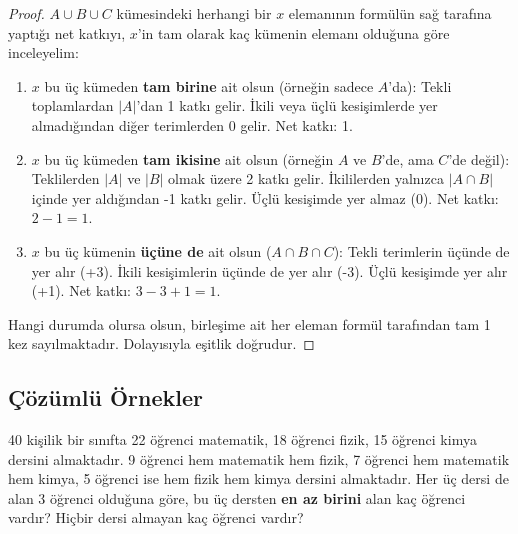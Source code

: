 \begin{proof} $A \cup B \cup C$ kümesindeki herhangi bir $x$ elemanının formülün sağ
tarafına yaptığı net katkıyı, $x$'in tam olarak kaç kümenin elemanı olduğuna göre
inceleyelim: \begin{enumerate} \item $x$ bu üç kümeden \textbf{tam birine} ait
olsun (örneğin sadece $A$'da): Tekli toplamlardan $|A|$'dan 1 katkı gelir. İkili
veya üçlü kesişimlerde yer almadığından diğer terimlerden 0 gelir. Net katkı: 1.
\item $x$ bu üç kümeden \textbf{tam ikisine} ait olsun (örneğin $A$ ve $B$'de, ama
$C$'de değil): Teklilerden $|A|$ ve $|B|$ olmak üzere 2 katkı gelir. İkililerden
yalnızca $|A \cap B|$ içinde yer aldığından -1 katkı gelir. Üçlü kesişimde yer
almaz (0). Net katkı: $2 - 1 = 1$. \item $x$ bu üç kümenin \textbf{üçüne de} ait
olsun ($A \cap B \cap C$): Tekli terimlerin üçünde de yer alır (+3). İkili
kesişimlerin üçünde de yer alır (-3). Üçlü kesişimde yer alır (+1). Net katkı:
$3 - 3 + 1 = 1$. \end{enumerate} Hangi durumda olursa olsun, birleşime ait her
eleman formül tarafından tam 1 kez sayılmaktadır. Dolayısıyla eşitlik
doğrudur. \end{proof}

\subsection{Çözümlü Örnekler}

\begin{example} 40 kişilik bir sınıfta 22 öğrenci matematik, 18 öğrenci fizik,
15 öğrenci kimya dersini almaktadır. 9 öğrenci hem matematik hem fizik, 7
öğrenci hem matematik hem kimya, 5 öğrenci ise hem fizik hem kimya dersini
almaktadır. Her üç dersi de alan 3 öğrenci olduğuna göre, bu üç dersten
\textbf{en az birini} alan kaç öğrenci vardır? Hiçbir dersi almayan kaç öğrenci
vardır? \end{example}


